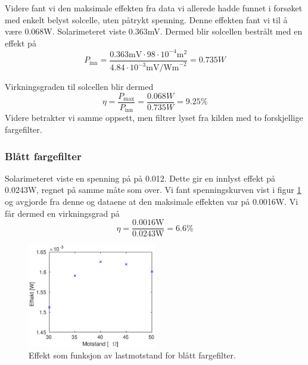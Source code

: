 \documentclass[a4paper,11pt, twocolumn]{article}
\begin{document}
Videre fant vi den maksimale effekten fra data vi allerede hadde funnet i forsøket med enkelt belyst solcelle, uten påtrykt spenning. Denne effekten fant vi til å være 0.068W. Solarimeteret viste 0.363mV. Dermed blir solcellen bestrålt med en effekt på
\begin{equation}
	P_\text{inn} = \frac{0.363\text{mV}\cdot98\cdot10^{-4}\text{m}^2}{4.84\cdot10^{-3}\text{mV/Wm}^{-2}} = 0.735W
\end{equation}

Virkningsgraden til solcellen blir dermed
\begin{equation}
	\eta = \frac{P_\text{max}}{P_\text{inn}} = \frac{0.068W}{0.735W} = 9.25\text{\%}
\end{equation}
Videre betrakter vi samme oppsett, men filtrer lyset fra kilden med to forskjellige fargefilter.
\subsubsection{Blått fargefilter}
Solarimeteret viste en spenning på på 0.012. Dette gir en innlyst effekt på 0.0243W, regnet på samme måte som over. Vi fant spenningskurven vist i figur \ref{fig:effektBlue} og avgjorde fra denne og dataene at den maksimale effekten var på 0.0016W. Vi får dermed en virkningsgrad på 
\begin{equation}
	\eta = \frac{0.0016\text{W}}{0.0243\text{W}} = 6.6\text{\%}
\end{equation}
\begin{figure}[!ht]
	\includegraphics[width = 0.5\textwidth]{matlab/LAB/effektBlue.eps}
	\caption{Effekt som funksjon av lastmotstand for blått fargefilter.}
	\label{fig:effektBlue}
\end{figure}
\end{document}
